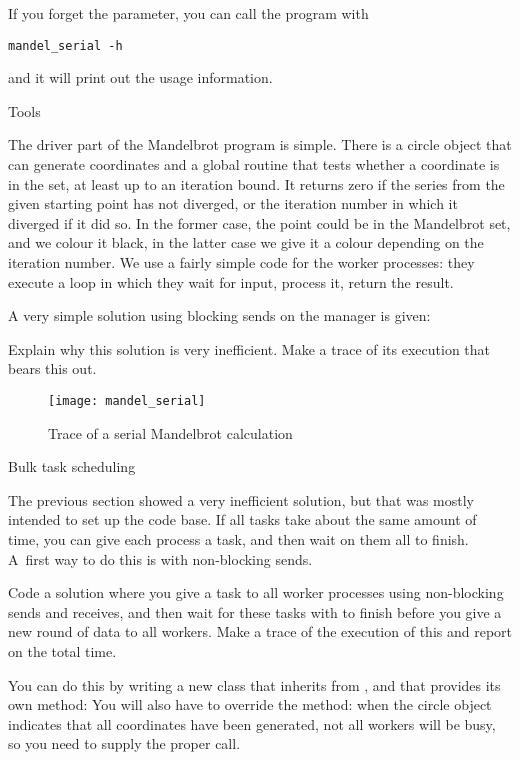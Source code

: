 If you forget the parameter, you can call the program with
\begin{verbatim}
mandel_serial -h
\end{verbatim}
and it will print out the usage information.

 {Tools}

The driver part of the Mandelbrot program is simple. There is a 
circle object that can generate coordinates
and a global routine that tests whether a coordinate is in the set,
at least up to an iteration bound. It returns zero if the 
series from the given starting point has not diverged,
or the iteration number in which it diverged if it did so.
In the former case,  the point could be in the Mandelbrot set, 
and we colour it black, in the latter case we give it a colour
depending on the iteration number.
We use a fairly simple code for the worker processes: they 
execute a loop in which they wait 
for input, process it, return the result.

A very simple solution using blocking sends on the manager is given:

\begin{exercise}
  Explain why this solution is very inefficient. Make a trace of its
  execution that bears this out.
\end{exercise}

\begin{figure}[ht]
\texttt{[image: mandel\_serial]}
\caption{Trace of a serial Mandelbrot calculation}
\label{fig:mandel-serial}
\end{figure}

 {Bulk task scheduling}
\label{proj:mandel-bulk}

The previous section showed a very inefficient solution, but that was mostly
intended to set up the code base. If all tasks take about the same amount of time,
you can give each process a task, and then wait on them all to finish. A~first way
to do this is with non-blocking sends.

\begin{exercise}
  Code a  solution where you give a task to all worker processes
  using non-blocking sends and receives, and then wait for these tasks
  with 
  to finish before you give a new round of data to all workers.
  Make a trace of the execution of this and report on the total time.

  You can do this by writing a new class that inherits from ,
  and that provides its own  method:
  You will also have to override the  method: when the circle 
  object indicates that all coordinates have been generated, not all
  workers will be busy, so you need to supply the proper 
  call.
\end{exercise}

